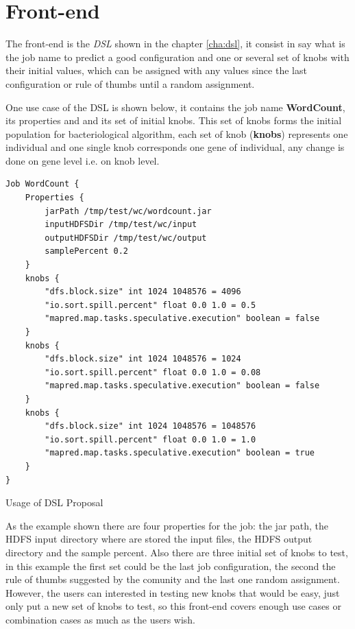 \section{Front-end}

The front-end is the {\it DSL} shown in the chapter \ref{cha:dsl}, it consist in
say what is the job name to predict a good configuration and one or several set of
knobs with their initial values, which can be assigned with any values since the
last configuration or rule of thumbs until a random assignment.

One use case of the DSL is shown below, it contains the job name \textbf{WordCount},
its properties and and its set of initial knobs. This set of knobs forms the initial population
for bacteriological algorithm, each set of knob ({\bf knobs}) represents one individual
and one single knob corresponds one gene of individual, any change is done on gene level i.e.
on knob level.

\singlespacing
\begin{listing}[H]
\begin{verbatim}
Job WordCount {
    Properties {
        jarPath /tmp/test/wc/wordcount.jar
        inputHDFSDir /tmp/test/wc/input
        outputHDFSDir /tmp/test/wc/output
        samplePercent 0.2
    }
    knobs {
	    "dfs.block.size" int 1024 1048576 = 4096
	    "io.sort.spill.percent" float 0.0 1.0 = 0.5 
	    "mapred.map.tasks.speculative.execution" boolean = false
    }
    knobs {
	    "dfs.block.size" int 1024 1048576 = 1024
	    "io.sort.spill.percent" float 0.0 1.0 = 0.08
	    "mapred.map.tasks.speculative.execution" boolean = false
    }
    knobs {
	    "dfs.block.size" int 1024 1048576 = 1048576
	    "io.sort.spill.percent" float 0.0 1.0 = 1.0
	    "mapred.map.tasks.speculative.execution" boolean = true
    }
}
\end{verbatim}
\caption{Usage of DSL Proposal} 
\label{listing:usageDSL}
\end{listing}

As the example shown there are four properties for the job: the jar path, the HDFS
input directory where are stored the input files, the HDFS output directory and the sample
percent. Also there are three initial set of knobs to test, in this example
the first set could be the last job configuration, the second the rule of thumbs
suggested by the comunity and the last one random assignment. However, the users
can interested in testing new knobs that would be easy, just only put a new set
of knobs to test, so this front-end covers enough use cases or combination cases
as much as the users wish.
\newline
\newline
